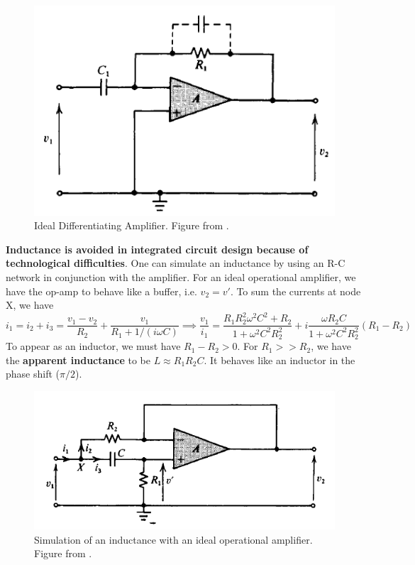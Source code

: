 \documentclass[a4paper]{article}
\begin{document}
\begin{figure}[H]
    \centering
    \includegraphics[scale=0.65]{differentiatingideal.PNG}
    \caption{Ideal Differentiating Amplifier. Figure from \cite{ahmed_spreadbury_1984}.}
    \label{differentiatingideal}
\end{figure}
\begin{eg}
\textbf{Inductance is avoided in integrated circuit design because of technological difficulties}. One can simulate an inductance by using an R-C network in conjunction with the amplifier. For an ideal operational amplifier, we have the op-amp to behave like a buffer, i.e. $v_2=v'$. To sum the currents at node X, we have
$$i_1=i_2+i_3=\frac{v_1-v_2}{R_2}+\frac{v_1}{R_1+1/(i\omega C)}\implies\frac{v_1}{i_1}=\frac{R_1R_2^2\omega^2C^2+R_2}{1+\omega^2C^2R_2^2}+i\frac{\omega R_2C}{1+\omega^2C^2R_2^2}(R_1-R_2)$$
To appear as an inductor, we must have $R_1-R_2>0$. For $R_1>>R_2$, we have the \textbf{apparent inductance} to be $L\approx R_1R_2C$. It behaves like an inductor in the phase shift ($\pi/2$).
\end{eg}
\begin{figure}[H]
    \centering
    \includegraphics[scale=0.85]{simulatinginductance.PNG}
    \caption{Simulation of an inductance with an ideal operational amplifier. Figure from \cite{ahmed_spreadbury_1984}.}
    \label{simulatinginductance}
\end{figure}
\end{document}
